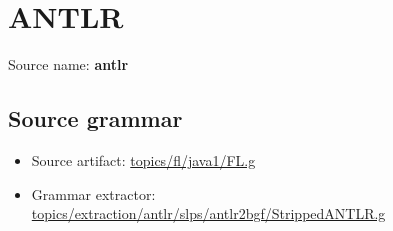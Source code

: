 \chapter{ANTLR}

 Source name: \textbf{antlr}

\section{Source grammar}

\begin{itemize}
\item Source artifact: \href{http://github.com/grammarware/slps/blob/master/topics/fl/java1/FL.g}{topics/fl/java1/FL.g}
\item Grammar extractor: \href{http://github.com/grammarware/slps/blob/master/topics/extraction/antlr/slps/antlr2bgf/StrippedANTLR.g}{topics/extraction/antlr/slps/antlr2bgf/StrippedANTLR.g}
\end{itemize}

